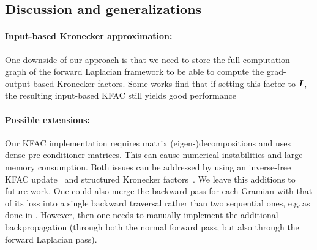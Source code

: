 \begin{comment}
into a matrix $\mZ^{(l)} \in \sR^{D_{\text{in}}\times S}$, likewise for the linear layer's outputs $\mZ^{(l+1)} = \mW^{(l)} \mZ^{(l)} \in \sR^{D_{\text{out}}\times S}$ and activation gradients $\mG^{(l)} \in \sR^{D_{\text{out}} \times S}$.\todo{introduce the gradient notation} 
The output-weight Jacobian of a weight-sharing layer is $\jac_{\mW^{(l)}} \mZ^{(l+1)} = {\mZ^{(l)}}^{\top} \otimes \mI$ \cite[see e.g.][]{dangel2020modular} and the Fisher does not simplify into a Kronecker product without further approximations.
We will focus on the \emph{expand} approximation, which yields the Kronecker approximation for convolutional layers proposed by~\citet{grosse2016kroneckerfactored}.
It treats the shared axis like a batch axis,
\begin{align}
    \mF(\mW^{(l)}) = \frac1S \sum_{s=1}^S (\vz_s^{(l)} \otimes {\vg_s^{(l)}}^\top)({\vz_s^{(l)}}^{\top}\otimes \vg_s^{(l)}) \approx \frac{1}{S} \sum_{s=1}^S \vz_s \vz_s^{\top} \otimes \sum_{s=1}^S \vg_s \vg_s^{\top}. %
\end{align}
We can express this in matrix notation as $\mF(\mW^{(l)}) \approx \nicefrac{1}{S} \mZ^{(l)} {\mZ^{(l)}}^{\top} \otimes \mG^{(l)} {\mG^{(l)}}^{\top}$.
\end{comment}
\subsection{Discussion and generalizations}


\paragraph{Input-based Kronecker approximation:} One downside of our approach is that we need to store the full computation graph of the forward Laplacian framework to be able to compute the grad-output-based Kronecker factors.
Some works find that if setting this factor to ${\bm{I}}$, the resulting input-based KFAC still yields good performance~\cite{benzing2022gradient,petersen2023isaac}

\paragraph{Possible extensions:} Our KFAC implementation requires matrix (eigen-)decompositions and uses dense pre-conditioner matrices.
This can cause numerical instabilities and large memory consumption.
Both issues can be addressed by using an inverse-free KFAC update~\cite{lin2023simplifying} and structured Kronecker factors~\cite{lin2023structured}.
We leave this additions to future work.
One could also merge the backward pass for each Gramian with that of its loss into a single backward traversal rather than two sequential ones, e.g.\,as done in \cite{dangel2020backpack}.
However, then one needs to manually implement the additional backpropagation (through both the normal forward pass, but also through the forward Laplacian pass).


